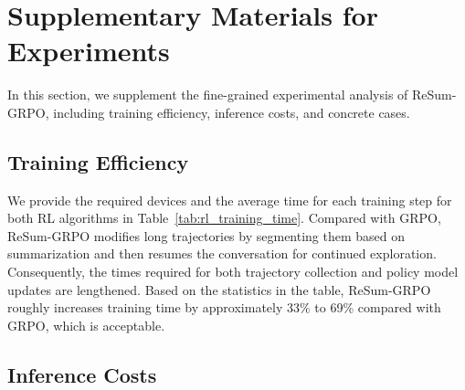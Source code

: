\clearpage
\newpage 
\section{Supplementary Materials for Experiments}\label{appendix:fine_grained_resumgrpo}

In this section, we supplement the fine-grained experimental analysis of ReSum-GRPO, including training efficiency, inference costs, and concrete cases. 


\subsection{Training Efficiency}
\begin{table}[!h]
    \centering
     \caption{\textbf{Comparison of average time per single gradient update step across RL algorithms.} Each step is configured with \texttt{batch\_size}$=64$ and $G=8$, optimizing over 512 collected trajectories.}
    \label{tab:rl_training_time}
\end{table}

We provide the required devices and the average time for each training step for both RL algorithms in Table~\ref{tab:rl_training_time}. Compared with GRPO, ReSum-GRPO modifies long trajectories by segmenting them based on summarization and then resumes the conversation for continued exploration. Consequently, the times required for both trajectory collection and policy model updates are lengthened. Based on the statistics in the table, ReSum-GRPO roughly increases training time by approximately 33\% to 69\% compared with GRPO, which is acceptable.


\subsection{Inference Costs}

